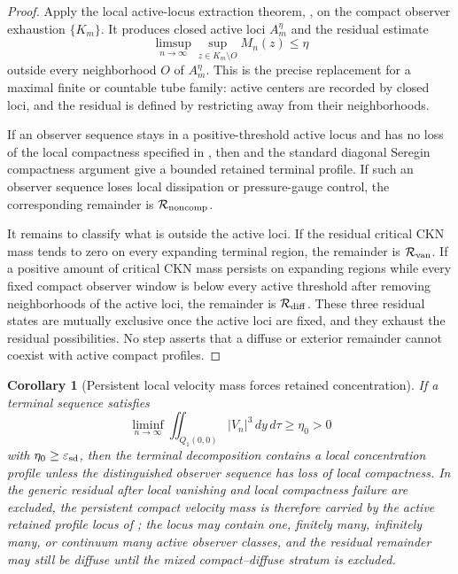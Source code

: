 \documentclass[11pt]{amsart}
\numberwithin{equation}{section}
\theoremstyle{plain}
\newtheorem{corollary}[theorem]{Corollary}
\theoremstyle{definition}
\theoremstyle{remark}
\newcommand{\eps}{\varepsilon}
\begin{document}
\begin{proof}
Apply the local active-locus extraction theorem,
, on the compact observer exhaustion
\(\{K_m\}\).  It produces closed active loci \(A_m^\eta\) and the residual
estimate
\[
   \limsup_{n\to\infty}
   \sup_{z\in K_m\setminus O}M_n(z)\le\eta
\]
outside every neighborhood \(O\) of \(A_m^\eta\).  This is the precise
replacement for a maximal finite or countable tube family: active centers are
recorded by closed loci, and the residual is defined by restricting away from
their neighborhoods.

If an observer sequence stays in a positive-threshold active locus and has no
loss of the local compactness specified in , then
 and the standard diagonal Seregin compactness
argument give a bounded retained terminal profile.  If such an observer
sequence loses local dissipation or pressure-gauge control, the corresponding
remainder is \(\mathcal R_{\rm noncomp}\).

It remains to classify what is outside the active loci.  If the residual
critical CKN mass tends to zero on every expanding terminal region, the
remainder is \(\mathcal R_{\rm van}\).  If a positive amount of critical CKN
mass persists on expanding regions while every fixed compact observer window is
below every active threshold after removing neighborhoods of the active loci,
the remainder is \(\mathcal R_{\rm diff}\).  These three residual states are
mutually exclusive once the active loci are fixed, and they exhaust the
residual possibilities.  No step asserts that a diffuse or exterior remainder
cannot coexist with active compact profiles.
\end{proof}

\begin{corollary}[Persistent local velocity mass forces retained concentration]
\label{cor:persistent-forces-active}
If a terminal sequence satisfies
\[
   \liminf_{n\to\infty}
   \iint_{Q_1(0,0)} |V_n|^3\,dy\,d\tau\ge\eta_0>0
\]
with \(\eta_0\ge\eps_{\rm sd}\), then the terminal decomposition contains a
local concentration profile unless the distinguished observer sequence has
loss of local compactness.  In the generic residual after local vanishing and
local compactness failure are excluded, the persistent compact velocity mass is
therefore carried by the active retained profile locus of
; the locus may contain one, finitely many,
infinitely many, or continuum many active observer classes, and the residual
remainder may still be diffuse until the mixed compact--diffuse stratum is
excluded.
\end{corollary}
\end{document}
